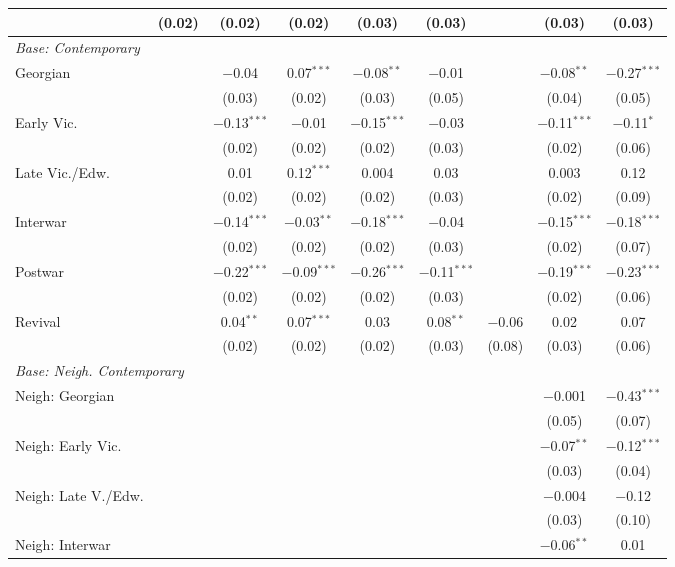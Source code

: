 \documentclass[]{article}
\begin{document}
\begin{table}[!htbp]
\begin{tabular}{@{\extracolsep{5pt}}lcccccccc}
  & (0.02) & (0.02) & (0.02) & (0.03) & (0.03) &  & (0.03) & (0.03) \\ 
   \midrule
 \multicolumn{3}{l}{\emph{Base: Contemporary}}
\vspace{2mm} \\
  Georgian &  & $-$0.04 & 0.07$^{***}$ & $-$0.08$^{**}$ & $-$0.01 &  & $-$0.08$^{**}$ & $-$0.27$^{***}$ \\ 
  &  & (0.03) & (0.02) & (0.03) & (0.05) &  & (0.04) & (0.05) \\ 
  Early Vic. &  & $-$0.13$^{***}$ & $-$0.01 & $-$0.15$^{***}$ & $-$0.03 &  & $-$0.11$^{***}$ & $-$0.11$^{*}$ \\ 
  &  & (0.02) & (0.02) & (0.02) & (0.03) &  & (0.02) & (0.06) \\ 
  Late Vic./Edw. &  & 0.01 & 0.12$^{***}$ & 0.004 & 0.03 &  & 0.003 & 0.12 \\ 
  &  & (0.02) & (0.02) & (0.02) & (0.03) &  & (0.02) & (0.09) \\ 
  Interwar &  & $-$0.14$^{***}$ & $-$0.03$^{**}$ & $-$0.18$^{***}$ & $-$0.04 &  & $-$0.15$^{***}$ & $-$0.18$^{***}$ \\ 
  &  & (0.02) & (0.02) & (0.02) & (0.03) &  & (0.02) & (0.07) \\ 
  Postwar &  & $-$0.22$^{***}$ & $-$0.09$^{***}$ & $-$0.26$^{***}$ & $-$0.11$^{***}$ &  & $-$0.19$^{***}$ & $-$0.23$^{***}$ \\ 
  &  & (0.02) & (0.02) & (0.02) & (0.03) &  & (0.02) & (0.06) \\ 
  Revival &  & 0.04$^{**}$ & 0.07$^{***}$ & 0.03 & 0.08$^{**}$ & $-$0.06 & 0.02 & 0.07 \\ 
  &  & (0.02) & (0.02) & (0.02) & (0.03) & (0.08) & (0.03) & (0.06) \\ 
 \midrule
 \multicolumn{3}{l}{\emph{Base: Neigh. Contemporary}}
\vspace{2mm} \\
  Neigh: Georgian &  &  &  &  &  &  & $-$0.001 & $-$0.43$^{***}$ \\ 
  &  &  &  &  &  &  & (0.05) & (0.07) \\ 
  Neigh: Early Vic. &  &  &  &  &  &  & $-$0.07$^{**}$ & $-$0.12$^{***}$ \\ 
  &  &  &  &  &  &  & (0.03) & (0.04) \\ 
  Neigh: Late V./Edw. &  &  &  &  &  &  & $-$0.004 & $-$0.12 \\ 
  &  &  &  &  &  &  & (0.03) & (0.10) \\ 
  Neigh: Interwar &  &  &  &  &  &  & $-$0.06$^{**}$ & 0.01 \\ 

\end{tabular}
\end{table}
\end{document}
